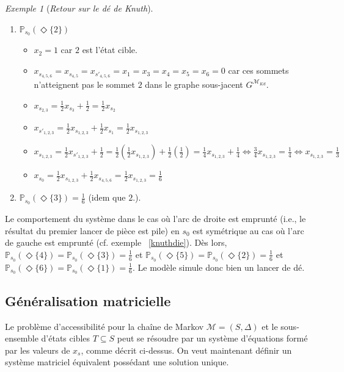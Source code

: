 \documentclass[12pt,a4paper]{report}
\theoremstyle{definition}%
\theoremstyle{remark}
\newtheorem{example}{Exemple}[chapter]
\newcommand{\ie}{i.e., }
\newcommand{\cf}{cf. }
\let\labelitemi\labelitemii
\begin{document}
\begin{example}[\textit{Retour sur le dé de Knuth}]
\begin{spacing}{1.5}
\begin{enumerate}
\begin{itemize}
		\end{itemize}
		\item $\mathbb{P}_{s_0} ( \Diamond \{2\})$
		\begin{itemize}
			\renewcommand{\labelitemi}{\tiny$\bullet$}
			\item $x_2 = 1 $ car $2$ est l'état cible.
			\item $x_{s_{4, 5, 6}} = x_{s_{4, 5}} = x_{s'_{4, 5, 6}} = x_1 = x_3 = x_4 = x_5 = x_6 = 0$ car ces sommets n'atteignent pas le sommet $2$ dans le graphe sous-jacent $G^{\mathcal{M}_{Kd}}$.
			\item $x_{s_{2, 3}} = \frac{1}{2} x_{s_3}  + \frac{1}{2} = \frac{1}{2} x_{s_2}$
			\item $x_{s'_{1, 2, 3}} = \frac{1}{2} x_{s_{1, 2, 3}} + \frac{1}{2} x_{s_1} = \frac{1}{2} x_{s_{1, 2, 3}}$
			\item $x_{s_{1, 2, 3}} = \frac{1}{2} x_{s'_{1, 2, 3}} + \frac{1}{2}  =
			\frac{1}{2} (\frac{1}{2} x_{s_{1, 2, 3}}) +\frac{1}{2} (\frac{1}{2})
			= \frac{1}{4} x_{s_{1, 2, 3}} +\frac{1}{4}
			\Leftrightarrow \frac{3}{4} x_{s_{1, 2, 3}} = \frac{1}{4}
			\Leftrightarrow x_{s_{1, 2, 3}} = \frac{1}{3}$
			\item $x_{s_0} = \frac{1}{2} x_{s_{1,2,3}} + \frac{1}{2} x_{s_{4, 5, 6}} = \frac{1}{2} x_{s_{1,2,3}} = \frac{1}{6}$
		\end{itemize}
		\item $\mathbb{P}_{s_0} (\Diamond \{3\}) = \frac{1}{6}$ (idem que $2.$).
	\end{enumerate}\end{spacing}
	Le comportement du système dans le cas où l'arc de droite est emprunté (\ie le résultat du premier lancer de pièce est pile) en $s_0$ est symétrique au cas où l'arc de gauche est emprunté (\cf exemple  ~\ref{knuthdie}). Dès lors, $\mathbb{P}_{s_0}(\Diamond \{4\}) = \mathbb{P}_{s_0}(\Diamond \{3\}) = \frac{1}{6}$ et $\mathbb{P}_{s_0}(\Diamond \{5\}) = \mathbb{P}_{s_0}(\Diamond \{2\}) = \frac{1}{6}$ et $\mathbb{P}_{s_0}(\Diamond \{6\}) = \mathbb{P}_{s_0}(\Diamond \{1\}) = \frac{1}{6}$. Le modèle simule donc bien un lancer de dé.

\end{example}

\subsection{Généralisation matricielle}
Le problème d'accessibilité pour la chaîne de Markov $\mathcal{M} = (S, \Delta)$ et le sous-ensemble d'états cibles $T \subseteq S$ peut se résoudre par un système d'équations formé par les valeurs de $x_s$, comme décrit ci-dessus. On veut maintenant définir un système matriciel équivalent possédant une solution unique.\\
\end{document}
